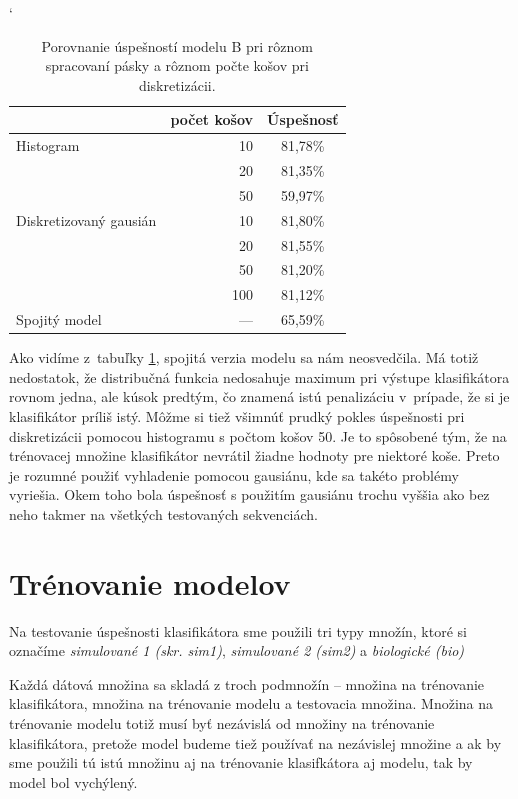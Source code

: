 \begin{table}[h]
\catcode`
\centering
\begin{tabular}{lrc}
\toprule
& počet košov & Úspešnosť\\
\midrule
Histogram & 10 & 81,78\%\\
 & 20 & 81,35\%\\
 & 50 & 59,97\%\\
Diskretizovaný gausián & 10 & 81,80\%\\
 & 20 & 81,55\%\\
 & 50 & 81,20\%\\
 & 100 & 81,12\%\\
Spojitý model & --- & 65,59\%\\
\bottomrule
\end{tabular}
\vspace{0.5cm}
\caption[Porovnanie úspešností pri rôznom spracovaní pásky]{Porovnanie úspešností modelu B pri rôznom spracovaní pásky a rôznom počte košov pri diskretizácii.}
\label{tab:success-b-tape}
\end{table}

Ako vidíme z~tabuľky \ref{tab:success-b-tape}, spojitá verzia modelu sa nám neosvedčila. Má totiž nedostatok, že distribučná funkcia nedosahuje maximum pri výstupe klasifikátora rovnom jedna, ale kúsok predtým, čo znamená istú penalizáciu v~prípade, že si je klasifikátor príliš istý.
Môžme si tiež všimnúť prudký pokles úspešnosti pri diskretizácii pomocou histogramu s počtom košov 50. Je to spôsobené tým, že na trénovacej množine klasifikátor nevrátil žiadne hodnoty pre niektoré koše. Preto je rozumné použiť vyhladenie pomocou gausiánu, kde sa takéto problémy vyriešia. Okem toho bola úspešnosť s použitím gausiánu trochu vyššia ako bez neho takmer na všetkých testovaných sekvenciách.

\section{Trénovanie modelov}
\label{sec:model-training}

Na testovanie úspešnosti klasifikátora sme použili tri typy množín, ktoré si označíme \textit{simulované 1 (skr. sim1)}, \textit{simulované 2 (sim2)} a \textit{biologické (bio)}

Každá dátová množina sa skladá z troch podmnožín -- množina na trénovanie klasifikátora, množina na trénovanie modelu a testovacia množina.
Množina na trénovanie modelu totiž musí byť nezávislá od množiny na trénovanie klasifikátora, pretože model budeme tiež používať na nezávislej množine a ak by sme použili tú istú množinu aj na trénovanie klasifkátora aj modelu, tak by model bol vychýlený.

